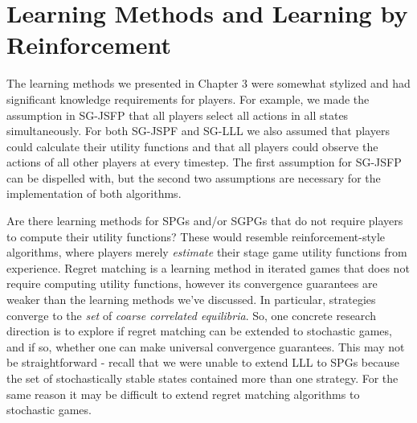 \section{Learning Methods and Learning by Reinforcement}

The learning methods we presented in Chapter 3 were somewhat stylized and had significant knowledge requirements for players. For example, we made the assumption in SG-JSFP that all players select all actions in all states simultaneously. For both SG-JSPF and SG-LLL we also assumed that players could calculate their utility functions and that all players could observe the actions of all other players at every timestep. The first assumption for SG-JSFP can be dispelled with, but the second two assumptions are necessary for the implementation of both algorithms. 

Are there learning methods for SPGs and/or SGPGs that do not require players to compute their utility functions? These would resemble reinforcement-style algorithms, where players merely {\em estimate} their stage game utility functions from experience. Regret matching \cite{sergiu2013simple} is a learning method in iterated games that does not require computing utility functions, however its convergence guarantees are weaker than the learning methods we've discussed. In particular, strategies converge to the {\em set} of {\em coarse correlated equilibria}. So, one concrete research direction is to explore if regret matching can be extended to stochastic games, and if so, whether one can make universal convergence guarantees. This may not be straightforward - recall that we were unable to extend LLL to SPGs because the set of stochastically stable states contained more than one strategy. For the same reason it may be difficult to extend regret matching algorithms to stochastic games.